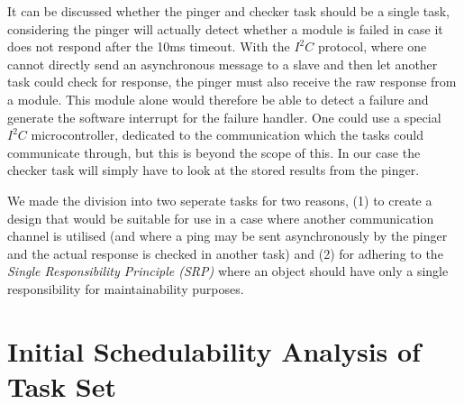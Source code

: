 It can be discussed whether the pinger and checker task should be a single task, considering the pinger will actually detect whether a module is failed in case it does not respond after the 10ms timeout. With the $\textit{I}^2\textit{C}$ protocol, where one cannot directly send an asynchronous message to a slave and then let another task could check for response, the pinger must also receive the raw response from a module. This module alone would therefore be able to detect a failure and generate the software interrupt for the failure handler. One could use a special $\textit{I}^2\textit{C}$ microcontroller, dedicated to the communication which the tasks could communicate through, but this is beyond the scope of this. In our case the checker task will simply have to look at the stored results from the pinger.

We made the division into two seperate tasks for two reasons, (1) to create a design that would be suitable for use in a case where another communication channel is utilised (and where a ping may be sent asynchronously by the pinger and the actual response is checked in another task) and (2) for adhering to the \textit{Single Responsibility Principle (SRP)} where an object should have only a single responsibility for maintainability purposes.

\section{Initial Schedulability Analysis of Task Set}

